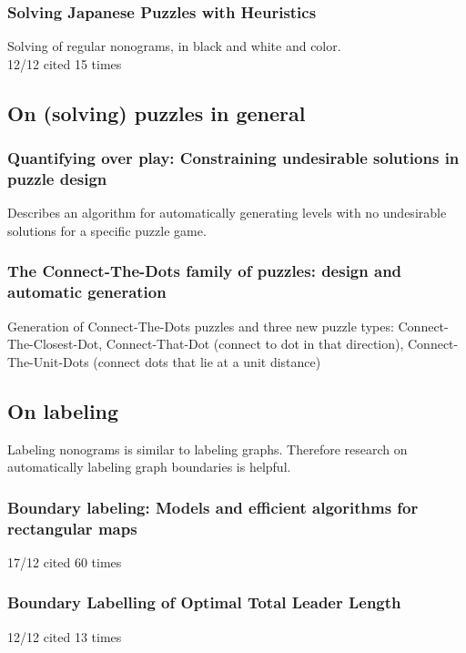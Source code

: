 \documentclass[a4paper]{article}
\begin{document}
\subsubsection{Solving Japanese Puzzles with Heuristics \cite{salcedo2007solving}}
Solving of regular nonograms, in black and white and color.\\
12/12 cited 15 times

\subsection{On (solving) puzzles in general}

\subsubsection{Quantifying over play: Constraining undesirable solutions in puzzle design \cite{smith2013quantifying}}
Describes an algorithm for automatically generating levels with no undesirable solutions for a specific puzzle game.

\subsubsection{The Connect-The-Dots family of puzzles: design and automatic generation \cite{loffler2014connect}}
Generation of Connect-The-Dots puzzles and three new puzzle types: Connect-The-Closest-Dot, Connect-That-Dot (connect to dot in that direction), Connect-The-Unit-Dots (connect dots that lie at a unit distance)

\subsection{On labeling}
Labeling nonograms is similar to labeling graphs. Therefore research on automatically labeling graph boundaries is helpful.\\

\subsubsection{Boundary labeling: Models and efficient algorithms for rectangular maps \cite{bekos2007boundary}}
17/12 cited 60 times

\subsubsection{Boundary Labelling of Optimal Total Leader Length \cite{boundaryLabelling}}
12/12 cited 13 times
\end{document}
